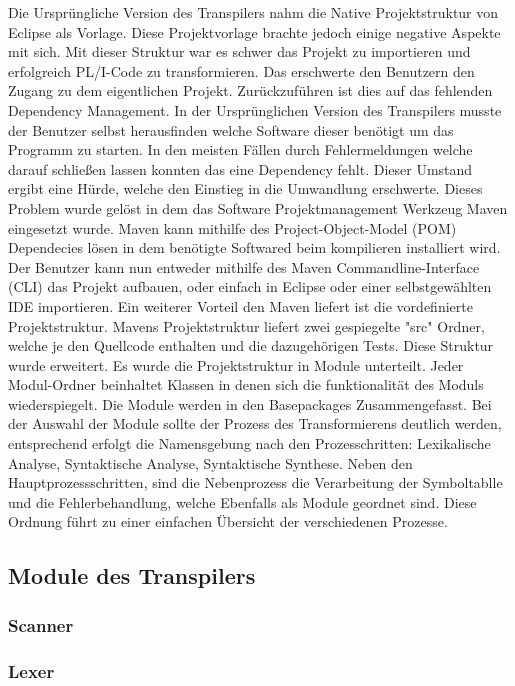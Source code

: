 Die Ursprüngliche Version des Transpilers nahm die Native Projektstruktur von Eclipse als Vorlage. Diese Projektvorlage brachte jedoch einige negative Aspekte mit sich. Mit dieser Struktur war es schwer das Projekt zu importieren und erfolgreich PL/I-Code zu transformieren. Das erschwerte den Benutzern den Zugang zu dem eigentlichen Projekt. 
Zurückzuführen ist dies auf das fehlenden Dependency Management. In der Ursprünglichen Version des Transpilers musste der Benutzer selbst herausfinden welche Software dieser benötigt um das Programm zu starten. In den meisten Fällen durch Fehlermeldungen welche darauf schließen lassen konnten das eine Dependency fehlt. Dieser Umstand ergibt eine Hürde, welche den Einstieg in die Umwandlung erschwerte. 
Dieses Problem wurde gelöst in dem das Software Projektmanagement Werkzeug Maven eingesetzt wurde. Maven kann mithilfe des Project-Object-Model (POM) Dependecies lösen in dem benötigte Softwared beim kompilieren installiert wird. Der Benutzer kann nun entweder mithilfe des Maven Commandline-Interface (CLI) das Projekt aufbauen, oder einfach in Eclipse oder einer selbstgewählten IDE importieren.
Ein weiterer Vorteil den Maven liefert ist die vordefinierte Projektstruktur. Mavens Projektstruktur liefert zwei gespiegelte "src" Ordner, welche je den Quellcode enthalten und die dazugehörigen Tests. Diese Struktur wurde erweitert. Es wurde die Projektstruktur in Module unterteilt. Jeder Modul-Ordner beinhaltet Klassen in denen sich die funktionalität des Moduls wiederspiegelt. Die Module werden in den Basepackages Zusammengefasst. Bei der Auswahl der Module sollte der Prozess des Transformierens deutlich werden, entsprechend erfolgt die Namensgebung nach den Prozesschritten: Lexikalische Analyse, Syntaktische Analyse, Syntaktische Synthese. Neben den Hauptprozessschritten, sind die Nebenprozess die Verarbeitung der Symboltablle und die Fehlerbehandlung, welche Ebenfalls als Module geordnet sind. Diese Ordnung führt zu einer einfachen Übersicht der verschiedenen Prozesse.

\subsection{Module des Transpilers}
\subsubsection{Scanner}
\subsubsection{Lexer}
